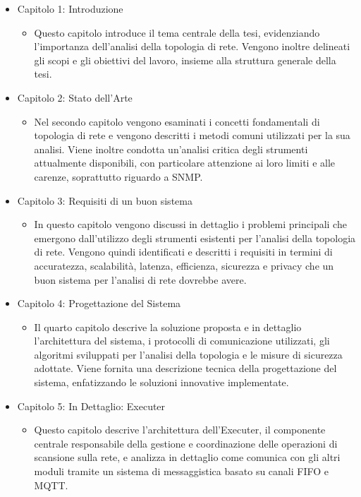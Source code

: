 \documentclass[target=bach,aauheader=,style=]{thud}
\begin{document}
\begin{itemize}
  \item Capitolo 1: Introduzione
  \begin{itemize}
    \item[] Questo capitolo introduce il tema centrale della tesi, evidenziando l'importanza dell'analisi della topologia di rete. Vengono inoltre delineati gli scopi e gli obiettivi del lavoro, insieme alla struttura generale della tesi.
  \end{itemize}

  \item Capitolo 2: Stato dell'Arte
    \begin{itemize}
      \item[] Nel secondo capitolo vengono esaminati i concetti fondamentali di topologia di rete e vengono descritti i metodi comuni utilizzati per la sua analisi. Viene inoltre condotta un'analisi critica degli strumenti attualmente disponibili, con particolare attenzione ai loro limiti e alle carenze, soprattutto riguardo a SNMP.
    \end{itemize}
  \item Capitolo 3: Requisiti di un buon sistema
    \begin{itemize}
      \item[] In questo capitolo vengono discussi in dettaglio i problemi principali che emergono dall'utilizzo degli strumenti esistenti per l'analisi della topologia di rete. Vengono quindi identificati e descritti i requisiti in termini di accuratezza, scalabilità, latenza, efficienza, sicurezza e privacy che un buon sistema per l'analisi di rete dovrebbe avere.
    \end{itemize}

  \item Capitolo 4: Progettazione del Sistema
    \begin{itemize}
      \item[] Il quarto capitolo descrive la soluzione proposta e in dettaglio l'architettura del sistema, i protocolli di comunicazione utilizzati, gli algoritmi sviluppati per l'analisi della topologia e le misure di sicurezza adottate. Viene fornita una descrizione tecnica della progettazione del sistema, enfatizzando le soluzioni innovative implementate.
    \end{itemize}

  \item Capitolo 5: In Dettaglio: Executer
    \begin{itemize}
      \item[] Questo capitolo descrive l'architettura dell'Executer, il componente centrale responsabile della gestione e coordinazione delle operazioni di scansione sulla rete, e analizza in dettaglio come comunica con gli altri moduli tramite un sistema di messaggistica basato su canali FIFO e MQTT.
    \end{itemize}


\end{itemize}
\end{document}
